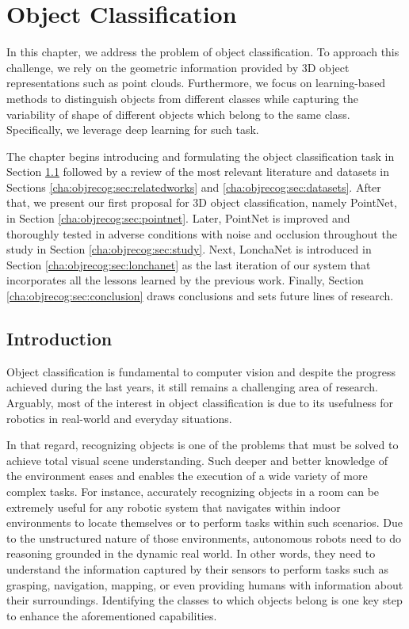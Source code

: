 \chapter{Object Classification}
\label{cha:objrecog}

\begin{chapterabstract}
In this chapter, we address the problem of object classification. To approach this challenge, we rely on the geometric information provided by 3D object representations such as point clouds. Furthermore, we focus on learning-based methods to distinguish objects from different classes while capturing the variability of shape of different objects which belong to the same class. Specifically, we leverage deep learning for such task.

The chapter begins introducing and formulating the object classification task in Section \ref{cha:objrecog:sec:introduction} followed by a review of the most relevant literature and datasets in Sections \ref{cha:objrecog:sec:relatedworks} and \ref{cha:objrecog:sec:datasets}. After that, we present our first proposal for 3D object classification, namely PointNet, in Section \ref{cha:objrecog:sec:pointnet}. Later, PointNet is improved and thoroughly tested in adverse conditions with noise and occlusion throughout the study in Section \ref{cha:objrecog:sec:study}. Next, LonchaNet is introduced in Section \ref{cha:objrecog:sec:lonchanet} as the last iteration of our system that incorporates all the lessons learned by the previous work. Finally, Section \ref{cha:objrecog:sec:conclusion} draws conclusions and sets future lines of research.
\end{chapterabstract}

\minitoc

\clearpage

\section{Introduction}
\label{cha:objrecog:sec:introduction}

Object classification is fundamental to computer vision and despite the progress achieved during the last years, it still remains a challenging area of research. Arguably, most of the interest in object classification is due to its usefulness for robotics in real-world and everyday situations.

In that regard, recognizing objects is one of the problems that must be solved to achieve total visual scene understanding. Such deeper and better knowledge of the environment eases and enables the execution of a wide variety of more complex tasks. For instance, accurately recognizing objects in a room can be extremely useful for any robotic system that navigates within indoor environments to locate themselves or to perform tasks within such scenarios. Due to the unstructured nature of those environments, autonomous robots need to do reasoning grounded in the dynamic real world. In other words, they need to understand the information captured by their sensors to perform tasks such as grasping, navigation, mapping, or even providing humans with information about their surroundings. Identifying the classes to which objects belong is one key step to enhance the aforementioned capabilities.

